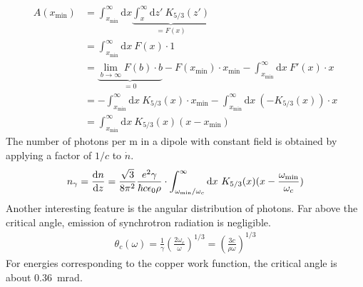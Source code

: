 \begin{align}
    A(x_\text{min}) &= \int_{x_\text{min}}^\infty \text{d}x  \underbrace{\int_x^\infty \text{d}z'\ K_{5/3}(z')}_{=F(x)}
    \\
    &=\int_{x_\text{min}}^\infty \text{d}x\ F(x) \cdot 1
    \\
    &= \underbrace{\lim_{b\rightarrow \infty}F(b) \cdot b}_{=0} - F(x_\text{min}) \cdot x_\text{min} - \int_{x_\text{min}}^\infty \text{d}x\ F'(x) \cdot x
    \\
    &= - \int_{x_\text{min}}^\infty \text{d}x\ K_{5/3}(x) \cdot x_\text{min} - \int_{x_\text{min}}^\infty \text{d}x\ (-K_{5/3}(x)) \cdot x
    \\
    &= \int_{x_\text{min}}^\infty \text{d}x\ K_{5/3}(x) (x-x_\text{min})
\end{align}
The number of photons per m in a dipole with constant field is obtained by applying a factor of $1/c$ to $\dot{n}$.
\begin{align}
    n_\gamma = \frac{\text{d}n}{\text{d}z} = \frac{\sqrt{3}}{8\pi^2}\frac{e^2\gamma}{\hbar c \epsilon_0 \rho}
    \cdot
    \int_{\omega_\text{min}/\omega_c}^\infty \text{d}x\ K_{5/3}(x) (x-\frac{\omega_\text{min}}{\omega_c})
    \label{eq:ngamma}
\end{align}
Another interesting feature is the angular distribution of photons.
Far above the critical angle, emission of synchrotron radiation is negligible.
\begin{align}
    \theta_c(\omega)
    = \frac{1}{\gamma}\left( \frac{2\omega_c}{\omega} \right)^{1/3}
    = \left( \frac{3c}{\rho\omega} \right)^{1/3}
    \label{eq:crit_angle}
\end{align}
For energies corresponding to the copper work function, the critical angle is about 0.36~mrad.

